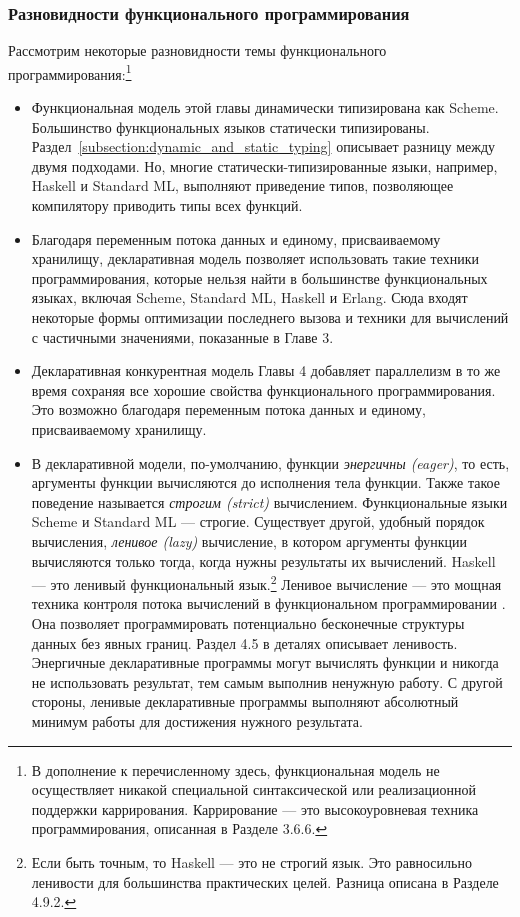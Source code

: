 \subsubsection{Разновидности функционального программирования}

Рассмотрим некоторые разновидности темы функционального программирования:\footnote{В дополнение к перечисленному здесь, функциональная модель не осуществляет никакой специальной синтаксической или реализационной поддержки каррирования. Каррирование --- это высокоуровневая техника программирования, описанная в Разделе 3.6.6.}

\begin{itemize}
\item{Функциональная модель этой главы динамически типизирована как Scheme. Большинство функциональных языков статически типизированы. Раздел~\ref{subsection:dynamic_and_static_typing} описывает разницу между двумя подходами. Но, многие статически-типизированные языки, например, Haskell и {Standard ML}, выполняют приведение типов, позволяющее компилятору приводить типы всех функций.}

\item{Благодаря переменным потока данных и единому, присваиваемому хранилищу, декларативная модель позволяет использовать такие техники программирования, которые нельзя найти в большинстве функциональных языках, включая Scheme, Standard ML, Haskell и Erlang. Сюда входят некоторые формы оптимизации последнего вызова и техники для вычислений с частичными значениями, показанные в Главе 3.}

\item{Декларативная конкурентная модель Главы 4 добавляет параллелизм в то же время сохраняя все хорошие свойства функционального программирования. Это возможно благодаря переменным потока данных и единому, присваиваемому хранилищу.}

\item{В декларативной модели, по-умолчанию, функции \emph{энергичны ({eager})}, то есть, аргументы функции вычисляются до исполнения тела функции. Также такое поведение называется \emph{строгим ({strict})} вычислением. Функциональные языки Scheme и Standard ML --- строгие. Существует другой, удобный порядок вычисления, \emph{ленивое (lazy)} вычисление, в котором аргументы функции вычисляются только тогда, когда нужны результаты их вычислений. Haskell --- это ленивый функциональный язык.\footnote{Если быть точным, то Haskell --- это не строгий язык. Это равносильно ленивости для большинства практических целей. Разница описана в Разделе 4.9.2.} Ленивое вычисление --- это мощная техника контроля потока вычислений в функциональном программировании \cite{87}. Она позволяет программировать потенциально бесконечные структуры данных без явных границ. Раздел 4.5 в деталях описывает ленивость. Энергичные декларативные программы могут вычислять функции и никогда не использовать результат, тем самым выполнив ненужную работу. С другой стороны, ленивые декларативные программы выполняют абсолютный минимум работы для достижения нужного результата.}

\end{itemize}



